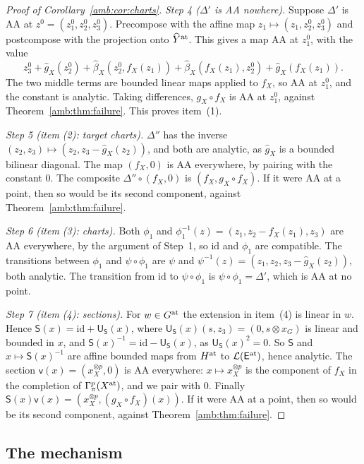 \documentclass[11pt]{amsart}
\theoremstyle{definition}
\theoremstyle{remark}
\numberwithin{equation}{section}
\newcommand{\cL}{\mathcal L}
\newcommand{\id}{\mathrm{id}}
\theoremstyle{plain}
\theoremstyle{definition}
\theoremstyle{plain}
\begin{document}
\begin{proof}[Proof of Corollary~\ref{amb:cor:charts}]
\emph{Step 4 ($\Delta'$ is AA nowhere).} Suppose $\Delta'$ is AA at $z^0=(z^0_1,z^0_2,z^0_3)$. Precompose with the affine map $z_1\mapsto(z_1,z^0_2,z^0_3)$ and postcompose with the projection onto $\widehat Y^{\rm at}$. This gives a map AA at $z^0_1$, with the value
\[
 z^0_3+\hat g_X(z^0_2)+\hat\beta_X(z^0_2,f_X(z_1))+\hat\beta_X(f_X(z_1),z^0_2)+\hat g_X(f_X(z_1)).
\]
The two middle terms are bounded linear maps applied to $f_X$, so AA at $z^0_1$, and the constant is analytic. Taking differences, $g_X\circ f_X$ is AA at $z^0_1$, against Theorem~\ref{amb:thm:failure}. This proves item~(1).

\emph{Step 5 (item (2): target charts).} $\Delta''$ has the inverse $(z_2,z_3)\mapsto(z_2,z_3-\hat g_X(z_2))$, and both are analytic, as $\hat g_X$ is a bounded bilinear diagonal. The map $(f_X,0)$ is AA everywhere, by pairing with the constant $0$. The composite $\Delta''\circ(f_X,0)$ is $(f_X,g_X\circ f_X)$. If it were AA at a point, then so would be its second component, against Theorem~\ref{amb:thm:failure}.

\emph{Step 6 (item (3): charts).} Both $\phi_1$ and $\phi_1^{-1}(z)=(z_1,z_2-f_X(z_1),z_3)$ are AA everywhere, by the argument of Step~1, so $\id$ and $\phi_1$ are compatible. The transitions between $\phi_1$ and $\psi\circ\phi_1$ are $\psi$ and $\psi^{-1}(z)=(z_1,z_2,z_3-\hat g_X(z_2))$, both analytic. The transition from $\id$ to $\psi\circ\phi_1$ is $\psi\circ\phi_1=\Delta'$, which is AA at no point.

\emph{Step 7 (item (4): sections).} For $w\in G^{\rm at}$ the extension in item~(4) is linear in $w$. Hence $\mathsf S(x)=\id+\mathsf U_{\mathsf S}(x)$, where $\mathsf U_{\mathsf S}(x)(s,z_3)=(0,s\otimes x_G)$ is linear and bounded in $x$, and $\mathsf S(x)^{-1}=\id-\mathsf U_{\mathsf S}(x)$, as $\mathsf U_{\mathsf S}(x)^2=0$. So $\mathsf S$ and $x\mapsto\mathsf S(x)^{-1}$ are affine bounded maps from $H^{\rm at}$ to $\cL(\mathsf E^{\rm at})$, hence analytic. The section $\mathsf v(x)=(x_X^{\otimes p},0)$ is AA everywhere: $x\mapsto x_X^{\otimes p}$ is the component of $f_X$ in the completion of $\Gamma^p_\pi(X^{\rm at})$, and we pair with $0$. Finally $\mathsf S(x)\mathsf v(x)=(x_X^{\otimes p},(g_X\circ f_X)(x))$. If it were AA at a point, then so would be its second component, against Theorem~\ref{amb:thm:failure}.
\end{proof}
\subsection{The mechanism}\label{amb:ssec:proofs-mechanism}
\end{document}
